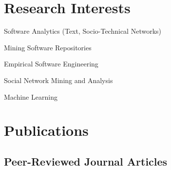 \documentclass[12pt,letterpaper]{article}
\newcommand{\listitemspace}{0.15em}
\renewenvironment{itemize}
{\begin{list}{}{\setlength{\leftmargin}{0em}
				\setlength{\parskip}{0em}
				\setlength{\itemsep}{\listitemspace}
				\setlength{\parsep}{\listitemspace}}}
{\end{list}}
\begin{document}
%
%
%			    
%
              




\section*{Research Interests}

\begin{itemize}
	
\item Software Analytics (Text, Socio-Technical Networks)
\item Mining Software Repositories
\item Empirical Software Engineering
\item Social Network Mining and Analysis
\item Machine Learning


\end{itemize}



\section*{Publications}


%
\subsection*{Peer-Reviewed Journal Articles}
\end{document}
